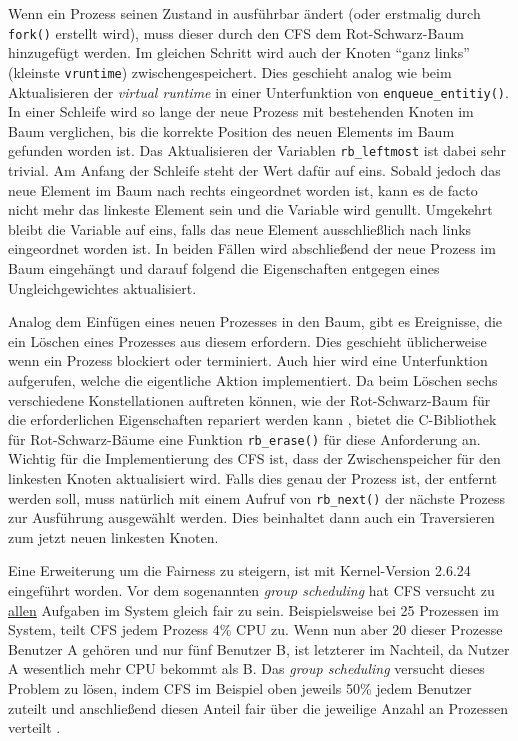 Wenn ein Prozess seinen Zustand in ausführbar ändert (oder erstmalig durch \texttt{fork()} erstellt wird), muss dieser durch den CFS dem Rot-Schwarz-Baum hinzugefügt werden. Im gleichen Schritt wird auch der Knoten ``ganz links'' (kleinste \texttt{vruntime}) zwischengespeichert. Dies geschieht analog wie beim Aktualisieren der \textit{virtual runtime} in einer Unterfunktion von \texttt{enqueue\_entitiy()}. In einer Schleife wird so lange der neue Prozess mit bestehenden Knoten im Baum verglichen, bis die korrekte Position des neuen Elements im Baum gefunden worden ist. Das Aktualisieren der Variablen \texttt{rb\_leftmost} ist dabei sehr trivial. Am Anfang der Schleife steht der Wert dafür auf eins. Sobald jedoch das neue Element im Baum nach rechts eingeordnet worden ist, kann es de facto nicht mehr das linkeste Element sein und die Variable wird genullt. Umgekehrt bleibt die Variable auf eins, falls das neue Element ausschließlich nach links eingeordnet worden ist. 
In beiden Fällen wird abschließend der neue Prozess im Baum eingehängt und darauf folgend die Eigenschaften entgegen eines Ungleichgewichtes aktualisiert.

Analog dem Einfügen eines neuen Prozesses in den Baum, gibt es Ereignisse, die ein Löschen eines Prozesses aus diesem erfordern. Dies geschieht üblicherweise wenn ein Prozess blockiert oder terminiert. Auch hier wird eine Unterfunktion aufgerufen, welche die eigentliche Aktion implementiert.
Da beim Löschen sechs verschiedene Konstellationen auftreten können, wie der Rot-Schwarz-Baum für die erforderlichen Eigenschaften repariert werden kann \cite{tcormen}, bietet die C-Bibliothek für Rot-Schwarz-Bäume eine Funktion  \texttt{rb\_erase()} für diese Anforderung an. Wichtig für die Implementierung des CFS ist, dass der Zwischenspeicher für den linkesten Knoten aktualisiert wird. Falls dies genau der Prozess ist, der entfernt werden soll, muss natür\-lich mit einem Aufruf von \texttt{rb\-\_next()} der näch\-ste Prozess zur Ausführung ausgewählt werden. Dies beinhaltet dann auch ein Traversieren zum jetzt neuen linkesten Knoten.


Eine Erweiterung um die Fairness zu steigern, ist mit Ker\-nel-Version 2.6.24 eingeführt worden. Vor dem sogenannten \textit{group scheduling} hat CFS versucht zu \underline{allen} Aufgaben im System gleich fair zu sein. Beispielsweise bei 25 Prozessen im System, teilt CFS jedem Prozess 4\% CPU zu. Wenn nun aber 20 dieser Prozesse Benutzer A gehören und nur fünf Benutzer B, ist letzterer im Nachteil, da Nutzer A wesentlich mehr CPU bekommt als B. Das \textit{group scheduling} versucht dieses Problem zu lösen, indem CFS im Beispiel oben jeweils 50\% jedem Benutzer zuteilt und anschließend diesen Anteil fair über die jeweilige Anzahl an Prozessen verteilt \cite{cpabla}. 
